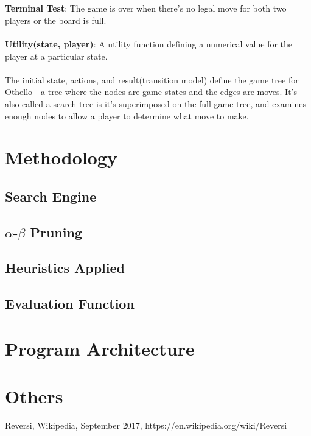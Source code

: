 \documentclass[letterpaper,12pt]{article}
\begin{document}
\\\\
\textbf{Terminal Test}: The game is over when there's no legal move for both two players or the board is full.
\\\\
\textbf{Utility(state, player)}: A utility function defining a numerical value for the player at a particular state.
\\\\
The initial state, actions, and result(transition model) define the game tree for Othello - a tree where the nodes are game states and the edges are moves. It's also called a search tree is it's superimposed on the full game tree, and examines enough nodes to allow a player to determine what move to make.


\section{Methodology}
\subsection{Search Engine}
\subsection{$\alpha$-$\beta$ Pruning}
\subsection{Heuristics Applied}
\subsection{Evaluation Function}


\section{Program Architecture}


\section{Others}


\begin{thebibliography}{}
\bibitem{}
Reversi, Wikipedia, September 2017, https://en.wikipedia.org/wiki/Reversi
\end{thebibliography}
\end{document}
